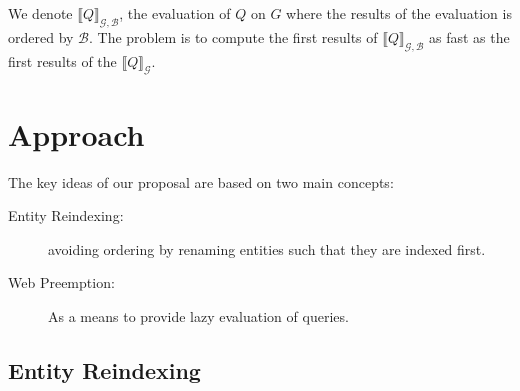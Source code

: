 \documentclass[runningheads]{llncs}
\begin{document}
We denote $\llbracket Q \rrbracket_\mathcal{G,B}$,
the evaluation of $Q$ on $G$ where the results of the evaluation is
ordered by $\mathcal{B}$. The problem is to compute the first results of
$\llbracket Q \rrbracket_\mathcal{G,B}$ as fast as  the first results of the $\llbracket Q
\rrbracket_\mathcal{G}.$

\section{Approach}
\label{sec:approach}

The key ideas of our proposal are based on two main concepts:
\begin{description}
\item[Entity Reindexing:] avoiding ordering  by
  renaming entities such that they are indexed first.
\item[Web Preemption:] As a means to provide lazy evaluation
  of queries.
\end{description}

\subsection{Entity Reindexing}
\end{document}
